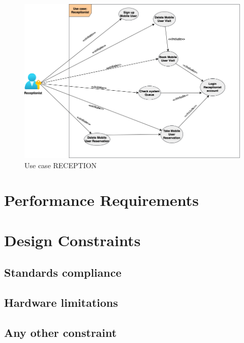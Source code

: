  \par \medskip 
 
 \begin{figure}[h]
 	\caption{Use case RECEPTION}
 	\label{fig:UML}
 	
 	\centering
 	\includegraphics[width=1\textwidth, height=1\textwidth]{diagrams/UseCaseReception.png}
 	
 \end{figure}
 
 
 

\section{Performance Requirements}
\section{Design Constraints}
\subsection{Standards compliance}
\subsection{Hardware limitations}
\subsection{Any other constraint}

